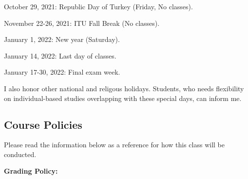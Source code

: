 \documentclass[
  12pt,
]{article}
\begin{document}
October 29, 2021: Republic Day of Turkey (Friday, No classes).

November 22-26, 2021: ITU Fall Break (No classes).

January 1, 2022: New year (Saturday).

January 14, 2022: Last day of classes.

January 17-30, 2022: Final exam week.

I also honor other national and religous holidays. Students, who needs
flexibility on individual-based studies overlapping with these special
days, can inform me.

\hypertarget{course-policies}{%
\subsection{Course Policies}\label{course-policies}}

Please read the information below as a reference for how this class will
be conducted.

\textbf{Grading Policy:}
\end{document}
